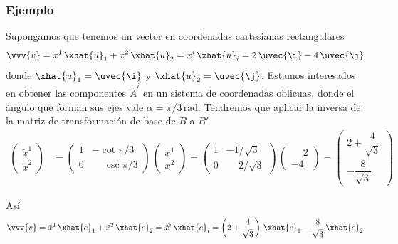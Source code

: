 \subsubsection{Ejemplo}
Supongamos que tenemos un vector en coordenadas cartesianas rectangulares
\[
  \vvv{v}
  = x^1\,\xhat{u}_1 + x^2\,\xhat{u}_2 = x^i\,\xhat{u}_i
  = 2\,\uvec{\i} - 4\,\uvec{\j}
\]
donde $\xhat{u}_1 = \uvec{\i}$ y $\xhat{u}_2 = \uvec{\j}$.
Estamos interesados en obtener las componentes $\tilde{A}^i$ en un sistema de
coordenadas oblicuas, donde el ángulo que forman sus ejes vale
$\alpha = \pi/3\,\unit{\radian}$. Tendremos que aplicar la inversa de la matriz de
transformación de base de $B$ a $B'$
\begin{align*}
  \begin{pmatrix}
    \tilde{x}^1\\
    \tilde{x}^2
  \end{pmatrix}
  &=
  \begin{pmatrix}
    1 & -\cot{\pi/3}\\
    0 & \phantom{-}\csc{\pi/3}
  \end{pmatrix}
  \,
  \begin{pmatrix}
    x^1\\
    x^2
  \end{pmatrix}
    =
    \begin{pmatrix}
      1 & -1/\sqrt{3}\\
      0 & \phantom{-}2/\sqrt{3}
    \end{pmatrix}
    \,
    \begin{pmatrix}
      \phantom{-}2\\
      -4
    \end{pmatrix}
    =
    \begin{pmatrix}
      2+\dfrac{4}{\sqrt{3}}\\[3ex]
      -\dfrac{8}{\sqrt{3}}
    \end{pmatrix}
\end{align*}

Así
\[
  \vvv{v}
  = \tilde{x}^1\,\xhat{e}_1 + \tilde{x}^2\,\xhat{e}_2 = \tilde{x}^i\,\xhat{e}_i
  = \left(2+\dfrac{4}{\sqrt{3}}\right)\,\xhat{e}_1 - \dfrac{8}{\sqrt{3}}\,\xhat{e}_2
\]

